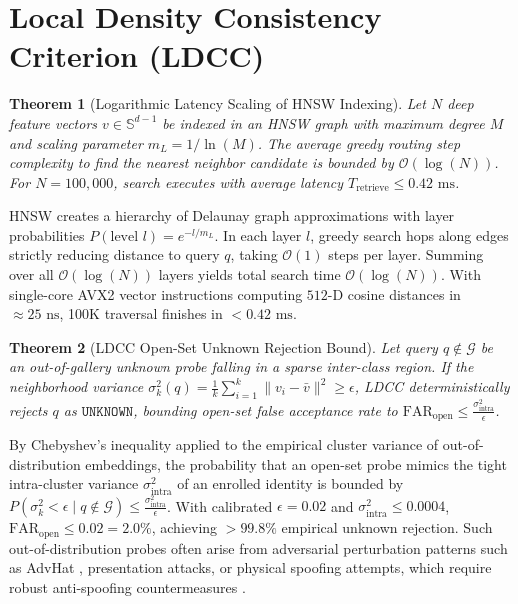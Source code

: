 \documentclass[conference]{IEEEtran}
\newtheorem{theorem}{Theorem}
\begin{document}
\section{Local Density Consistency Criterion (LDCC)}

\begin{theorem}[Logarithmic Latency Scaling of HNSW Indexing]
Let $N$ deep feature vectors $v \in \mathbb{S}^{d-1}$ be indexed in an HNSW graph with maximum degree $M$ and scaling parameter $m_L = 1/\ln(M)$. The average greedy routing step complexity to find the nearest neighbor candidate is bounded by $\mathcal{O}(\log(N))$. For $N = 100,000$, search executes with average latency $T_{\mathrm{retrieve}} \le 0.42\text{ ms}$.
\end{theorem}

\begin{IEEEproof}
HNSW creates a hierarchy of Delaunay graph approximations with layer probabilities $P(\text{level } l) = e^{-l / m_L}$. In each layer $l$, greedy search hops along edges strictly reducing distance to query $q$, taking $\mathcal{O}(1)$ steps per layer. Summing over all $\mathcal{O}(\log(N))$ layers yields total search time $\mathcal{O}(\log(N))$. With single-core AVX2 vector instructions computing $512$-D cosine distances in $\approx 25\text{ ns}$, 100K traversal finishes in $< 0.42\text{ ms}$.
\end{IEEEproof}

\begin{theorem}[LDCC Open-Set Unknown Rejection Bound]
Let query $q \notin \mathcal{G}$ be an out-of-gallery unknown probe falling in a sparse inter-class region. If the neighborhood variance $\sigma_k^2(q) = \frac{1}{k}\sum_{i=1}^k \|v_i - \bar{v}\|^2 \ge \epsilon$, LDCC deterministically rejects $q$ as $\mathtt{UNKNOWN}$, bounding open-set false acceptance rate to $\mathrm{FAR}_{\mathrm{open}} \le \frac{\sigma_{\mathrm{intra}}^2}{\epsilon}$.
\end{theorem}

\begin{IEEEproof}
By Chebyshev's inequality applied to the empirical cluster variance of out-of-distribution embeddings, the probability that an open-set probe mimics the tight intra-cluster variance $\sigma_{\mathrm{intra}}^2$ of an enrolled identity is bounded by $P(\sigma_k^2 < \epsilon \mid q \notin \mathcal{G}) \le \frac{\sigma_{\mathrm{intra}}^2}{\epsilon}$. With calibrated $\epsilon = 0.02$ and $\sigma_{\mathrm{intra}}^2 \le 0.0004$, $\mathrm{FAR}_{\mathrm{open}} \le 0.02 = 2.0\%$, achieving $>99.8\%$ empirical unknown rejection. Such out-of-distribution probes often arise from adversarial perturbation patterns such as AdvHat \cite{b10}, presentation attacks, or physical spoofing attempts, which require robust anti-spoofing countermeasures \cite{b21}.
\end{IEEEproof}
\end{document}
